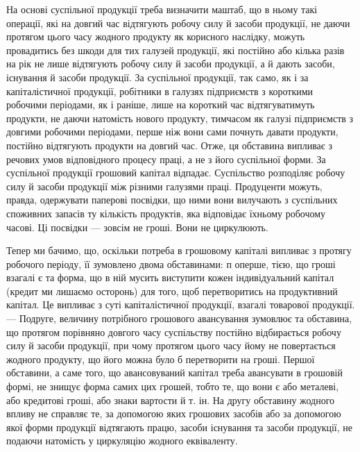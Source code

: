 
На основі суспільної продукції треба визначити маштаб, що в ньому
такі операції, які на довгий час відтягують робочу силу й засоби продукції,
не даючи протягом цього часу жодного продукту як корисного
наслідку, можуть провадитись без шкоди для тих галузей продукції, які
постійно або кілька разів на рік не лише відтягують робочу силу й засоби
продукції, а й дають засоби, існування й засоби продукції. За суспільної
продукції, так само, як і за капіталістичної продукції, робітники
в галузях підприємств з короткими робочими періодами, як і раніше, лише
на короткий час відтягуватимуть продукти, не даючи натомість нового
продукту, тимчасом як галузі підприємств з довгими робочими періодами,
перше ніж вони сами почнуть давати продукти, постійно відтягують
продукти на довгий час. Отже, ця обставина випливає з речових
умов відповідного процесу праці, а не з його суспільної форми. За суспільної
продукції грошовий капітал відпадає. Суспільство розподіляє робочу
силу й засоби продукції між різними галузями праці. Продуценти
можуть, правда, одержувати паперові посвідки, що ними вони вилучають
з суспільних споживних запасів ту кількість продуктів, яка відповідає їхньому
робочому часові. Ці посвідки — зовсім не гроші. Вони не циркулюють.

Тепер ми бачимо, що, оскільки потреба в грошовому капіталі випливає
з протягу робочого періоду, її зумовлено двома обставинами: п оперше,
тією, що гроші взагалі є та форма, що в ній мусить виступити
кожен індивідуальний капітал (кредит ми лишаємо осторонь) для того,
щоб перетворитись на продуктивний капітал. Це випливає з суті капіталістичної
продукції, взагалі товарової продукції. — Подруге, величину
потрібного грошового авансування зумовлює та обставина, що протягом
порівняно довгого часу суспільству постійно відбирається робочу силу
й засоби продукції, при чому протягом цього часу йому не повертається
жодного продукту, що його можна було б перетворити на гроші.
Першої обставини, а саме того, що авансовуваний капітал треба авансувати
в грошовій формі, не знищує форма самих цих грошей, тобто те,
що вони є або металеві, або кредитові гроші, або знаки вартости й
т. ін. На другу обставину жодного впливу не справляє те, за допомогою
яких грошових засобів або за допомогою якої форми продукції
відтягають працю, засоби існування та засоби продукції, не подаючи
натомість у циркуляцію жодного еквіваленту.
